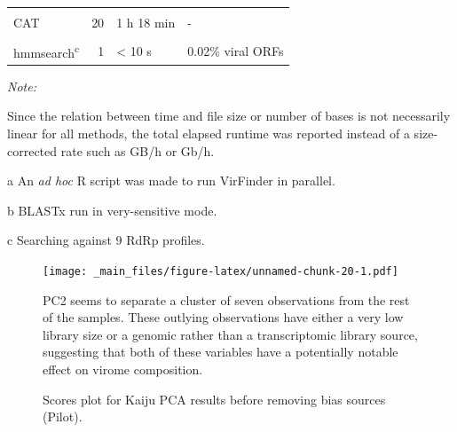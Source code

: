 \documentclass[
  openany]{book}
\begin{document}
\begin{table}
\begin{threeparttable}
\begin{tabular}[t]{>{\raggedright\arraybackslash}p{5cm}rll}
\hspace{1em}\cellcolor{gray!6}{DIAMOND\textsuperscript{b}} & \cellcolor{gray!6}{25} & \cellcolor{gray!6}{31 h 52 min} & \cellcolor{gray!6}{20\% viral contigs}\\
\hspace{1em}CAT & 20 & 1 h 18 min & -\\
\hspace{1em}\cellcolor{gray!6}{Prodigal (contigs)} & \cellcolor{gray!6}{1} & \cellcolor{gray!6}{8 min 10 s} & \cellcolor{gray!6}{1.26 ORFs/contig}\\
\hspace{1em}hmmsearch\textsuperscript{c} & 1 & < 10 s & 0.02\% viral ORFs\\
\bottomrule
\end{tabular}
\begin{tablenotes}
\item \textit{Note: } 
\item Since the relation between time and file size or number of bases is not necessarily linear for all methods, the total elapsed runtime was reported instead of a size-corrected rate such as GB/h or Gb/h.
\item[a] An \textit{ad hoc} R script was made to run VirFinder in parallel.
\item[b] BLASTx run in very-sensitive mode.
\item[c] Searching against 9 RdRp profiles.
\end{tablenotes}
\end{threeparttable}
\end{table}

\begin{figure}[!htbp]

\texttt{[image: \_main\_files/figure-latex/unnamed-chunk-20-1.pdf]}

\caption{Scores plot for Kaiju PCA results before removing bias sources (Pilot).\label{fig:sample50biases}}
PC2 seems to separate a cluster of seven observations from the rest of the samples. These outlying observations have either a very low library size or a genomic rather than a transcriptomic library source, suggesting that both of these variables have a potentially notable effect on virome composition.
\end{figure}
\end{document}

